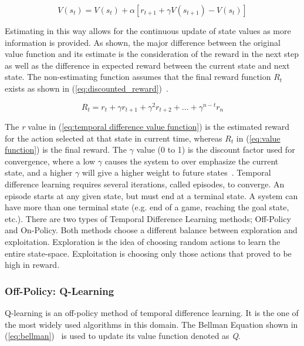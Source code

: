 \documentclass[12pt,american]{report}
\begin{document}
        \begin{equation}
            \label{eq:temporal difference value function}
            V(s_{t}) = V(s_{t}) + \alpha[r_{t+1} + \gamma V(s_{t+1})-V(s_{t})]
        \end{equation}
        
        Estimating in this way allows for the continuous update of state values as more information is provided. As shown, the major difference between the original value function and its estimate is the consideration of the reward in the next step as well as the difference in expected reward between the current state and next state. The non-estimating function assumes that the final reward function \textit{$R_{t}$} exists as shown in (\ref{eq:discounted_reward})~\cite{matiisen_2015}.
        
        \begin{equation}
            \label{eq:discounted_reward}
            R_{t} = r_t + \gamma r_{t+1} + \gamma^2 r_{t+2} + ... + \gamma^{n-t}r_n 
        \end{equation}
        
        The \textit{r} value in (\ref{eq:temporal difference value function}) is the estimated reward for the action selected at that state in current time, whereas \textit{$R_t$} in (\ref{eq:value function}) is the final reward.  The \begin{math}\gamma\end{math} value (0 to 1) is the discount factor used for convergence, where a low \begin{math}\gamma\end{math} causes the system to over emphasize the current state, and a higher \begin{math}\gamma\end{math} will give a higher weight to future states~\cite{Eden}. Temporal difference learning requires several iterations, called episodes, to converge. An episode starts at any given state, but must end at a terminal state.  A system can have more than one terminal state (e.g. end of a game, reaching the goal state, etc.). There are two types of Temporal Difference Learning methods; Off-Policy and On-Policy.  Both methods choose a different balance between exploration and exploitation.  Exploration is the idea of choosing random actions to learn the entire state-space.  Exploitation is choosing only those actions that proved to be high in reward.
        
        
        \subsubsection{Off-Policy: Q-Learning}
        Q-learning is an off-policy method of temporal difference learning. It is the one of the most widely used algorithms in this domain. The Bellman Equation shown in (\ref{eq:bellman})~\cite{matiisen_2015} is used to update its value function denoted as \textit{Q}.
        
\end{document}
